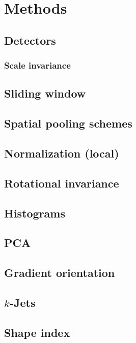 \documentclass[../thesis.tex]{subfiles}
\begin{document}
\section{Methods}

\subsection{Detectors}

\subsubsection{Scale invariance}

\subsection{Sliding window}

\subsection{Spatial pooling schemes}

\subsection{Normalization (local)}

\subsection{Rotational invariance}

\subsection{Histograms}

\subsection{PCA}

\subsection{Gradient orientation}

\subsection{$k$-Jets}

\subsection{Shape index}

\subbibliography
\end{document}
